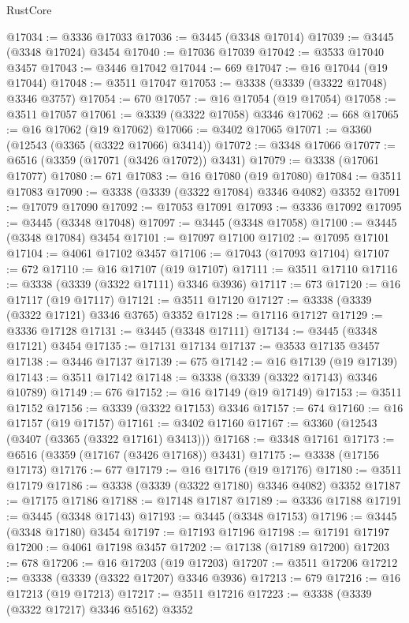 \begin{lexlean}{RustCore}
\begin{coremodule}
@17034 := @3336 @17033
@17036 := @3445 (@3348 @17014)
@17039 := @3445 (@3348 @17024) @3454
@17040 := @17036 @17039
@17042 := @3533 @17040 @3457
@17043 := @3446 @17042
@17044 := 669
@17047 := @16 @17044 (@19 @17044)
@17048 := @3511 @17047
@17053 := @3338 (@3339 (@3322 @17048) @3346 @3757)
@17054 := 670
@17057 := @16 @17054 (@19 @17054)
@17058 := @3511 @17057
@17061 := @3339 (@3322 @17058) @3346
@17062 := 668
@17065 := @16 @17062 (@19 @17062)
@17066 := @3402 @17065
@17071 := @3360 (@12543 (@3365 (@3322 @17066) @3414))
@17072 := @3348 @17066
@17077 := @6516 (@3359 (@17071 (@3426 @17072)) @3431)
@17079 := @3338 (@17061 @17077)
@17080 := 671
@17083 := @16 @17080 (@19 @17080)
@17084 := @3511 @17083
@17090 := @3338 (@3339 (@3322 @17084) @3346 @4082) @3352
@17091 := @17079 @17090
@17092 := @17053 @17091
@17093 := @3336 @17092
@17095 := @3445 (@3348 @17048)
@17097 := @3445 (@3348 @17058)
@17100 := @3445 (@3348 @17084) @3454
@17101 := @17097 @17100
@17102 := @17095 @17101
@17104 := @4061 @17102 @3457
@17106 := @17043 (@17093 @17104)
@17107 := 672
@17110 := @16 @17107 (@19 @17107)
@17111 := @3511 @17110
@17116 := @3338 (@3339 (@3322 @17111) @3346 @3936)
@17117 := 673
@17120 := @16 @17117 (@19 @17117)
@17121 := @3511 @17120
@17127 := @3338 (@3339 (@3322 @17121) @3346 @3765) @3352
@17128 := @17116 @17127
@17129 := @3336 @17128
@17131 := @3445 (@3348 @17111)
@17134 := @3445 (@3348 @17121) @3454
@17135 := @17131 @17134
@17137 := @3533 @17135 @3457
@17138 := @3446 @17137
@17139 := 675
@17142 := @16 @17139 (@19 @17139)
@17143 := @3511 @17142
@17148 := @3338 (@3339 (@3322 @17143) @3346 @10789)
@17149 := 676
@17152 := @16 @17149 (@19 @17149)
@17153 := @3511 @17152
@17156 := @3339 (@3322 @17153) @3346
@17157 := 674
@17160 := @16 @17157 (@19 @17157)
@17161 := @3402 @17160
@17167 := @3360 (@12543 (@3407 (@3365 (@3322 @17161) @3413)))
@17168 := @3348 @17161
@17173 := @6516 (@3359 (@17167 (@3426 @17168)) @3431)
@17175 := @3338 (@17156 @17173)
@17176 := 677
@17179 := @16 @17176 (@19 @17176)
@17180 := @3511 @17179
@17186 := @3338 (@3339 (@3322 @17180) @3346 @4082) @3352
@17187 := @17175 @17186
@17188 := @17148 @17187
@17189 := @3336 @17188
@17191 := @3445 (@3348 @17143)
@17193 := @3445 (@3348 @17153)
@17196 := @3445 (@3348 @17180) @3454
@17197 := @17193 @17196
@17198 := @17191 @17197
@17200 := @4061 @17198 @3457
@17202 := @17138 (@17189 @17200)
@17203 := 678
@17206 := @16 @17203 (@19 @17203)
@17207 := @3511 @17206
@17212 := @3338 (@3339 (@3322 @17207) @3346 @3936)
@17213 := 679
@17216 := @16 @17213 (@19 @17213)
@17217 := @3511 @17216
@17223 := @3338 (@3339 (@3322 @17217) @3346 @5162) @3352

\end{coremodule}
\end{lexlean}
